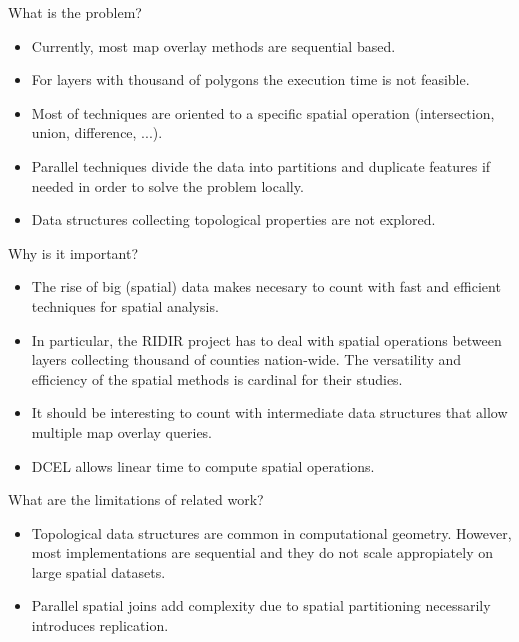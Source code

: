 \documentclass{beamer}
\begin{document}
\begin{frame}{What is the problem?}
    \begin{itemize}
        \item Currently, most map overlay methods are sequential based.
        \item For layers with thousand of polygons the execution time is not feasible.
        \item Most of techniques are oriented to a specific spatial operation (intersection, union, difference, ...).
        \item Parallel techniques divide the data into partitions and duplicate features if needed in order to solve the problem locally.
        \item Data structures collecting topological properties are not explored.
    \end{itemize}
\end{frame}

\begin{frame}{Why is it important?}
    \begin{itemize}
        \item The rise of big (spatial) data makes necesary to count with fast and efficient techniques for spatial analysis.
        \item In particular, the RIDIR project has to deal with spatial operations between layers collecting thousand of counties nation-wide.  The versatility and efficiency of the spatial methods is cardinal for their studies.
        \item It should be interesting to count with intermediate data structures that allow multiple map overlay queries. 
        \item DCEL allows linear time to compute spatial operations.
    \end{itemize}
\end{frame}

\begin{frame}{What are the limitations of related work?}
    \begin{itemize}
        \item Topological data structures are common in computational geometry.  However, most implementations are sequential and they do not scale appropiately on large spatial datasets.
        \item Parallel spatial joins add complexity due to spatial partitioning necessarily introduces replication.
    \end{itemize}
\end{frame}
\end{document}
